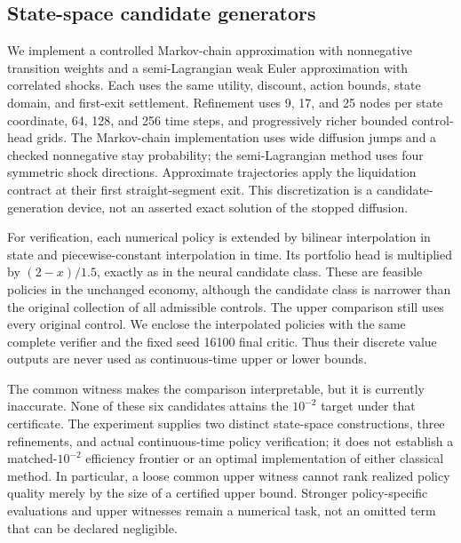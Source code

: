 \subsection{State-space candidate generators}
We implement a controlled Markov-chain approximation with nonnegative transition weights and a semi-Lagrangian weak Euler approximation with correlated shocks. Each uses the same utility, discount, action bounds, state domain, and first-exit settlement. Refinement uses 9, 17, and 25 nodes per state coordinate, 64, 128, and 256 time steps, and progressively richer bounded control-head grids. The Markov-chain implementation uses wide diffusion jumps and a checked nonnegative stay probability; the semi-Lagrangian method uses four symmetric shock directions. Approximate trajectories apply the liquidation contract at their first straight-segment exit. This discretization is a candidate-generation device, not an asserted exact solution of the stopped diffusion.

For verification, each numerical policy is extended by bilinear interpolation in state and piecewise-constant interpolation in time. Its portfolio head is multiplied by $(2-x)/1.5$, exactly as in the neural candidate class. These are feasible policies in the unchanged economy, although the candidate class is narrower than the original collection of all admissible controls. The upper comparison still uses every original control. We enclose the interpolated policies with the same complete verifier and the fixed seed 16100 final critic. Thus their discrete value outputs are never used as continuous-time upper or lower bounds.


The common witness makes the comparison interpretable, but it is currently inaccurate. None of these six candidates attains the $10^{-2}$ target under that certificate. The experiment supplies two distinct state-space constructions, three refinements, and actual continuous-time policy verification; it does not establish a matched-$10^{-2}$ efficiency frontier or an optimal implementation of either classical method. In particular, a loose common upper witness cannot rank realized policy quality merely by the size of a certified upper bound. Stronger policy-specific evaluations and upper witnesses remain a numerical task, not an omitted term that can be declared negligible.

